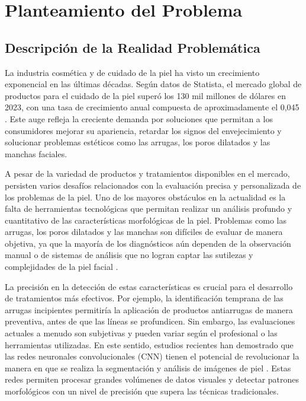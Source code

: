 \chapter{Planteamiento del Problema}
\section{Descripción de la Realidad Problemática}

La industria cosmética y de cuidado de la piel ha visto un crecimiento exponencial en las últimas décadas. Según datos de Statista, el mercado global de productos para el cuidado de la piel superó los 130 mil millones de dólares en 2023, con una tasa de crecimiento anual compuesta de aproximadamente el 0,045 \cite{statista2023}. Este auge refleja la creciente demanda por soluciones que permitan a los consumidores mejorar su apariencia, retardar los signos del envejecimiento y solucionar problemas estéticos como las arrugas, los poros dilatados y las manchas faciales.

A pesar de la variedad de productos y tratamientos disponibles en el mercado, persisten varios desafíos relacionados con la evaluación precisa y personalizada de los problemas de la piel. Uno de los mayores obstáculos en la actualidad es la falta de herramientas tecnológicas que permitan realizar un análisis profundo y cuantitativo de las características morfológicas de la piel. Problemas como las arrugas, los poros dilatados y las manchas son difíciles de evaluar de manera objetiva, ya que la mayoría de los diagnósticos aún dependen de la observación manual o de sistemas de análisis que no logran captar las sutilezas y complejidades de la piel facial \cite{phillips2020}.

La precisión en la detección de estas características es crucial para el desarrollo de tratamientos más efectivos. Por ejemplo, la identificación temprana de las arrugas incipientes permitiría la aplicación de productos antiarrugas de manera preventiva, antes de que las líneas se profundicen. Sin embargo, las evaluaciones actuales a menudo son subjetivas y pueden variar según el profesional o las herramientas utilizadas. En este sentido, estudios recientes han demostrado que las redes neuronales convolucionales (CNN) tienen el potencial de revolucionar la manera en que se realiza la segmentación y análisis de imágenes de piel \cite{esteva2017}. Estas redes permiten procesar grandes volúmenes de datos visuales y detectar patrones morfológicos con un nivel de precisión que supera las técnicas tradicionales.

